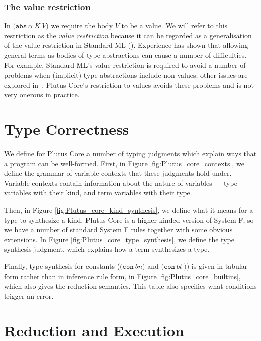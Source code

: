\documentclass[a4paper]{article}
\newcommand{\keyword}[1]{\texttt{#1}}
\newcommand{\construct}[1]{\texttt{(} #1 \texttt{)}}
\newcommand{\con}[1]{\construct{\keyword{con} ~ #1}}
\newcommand{\abs}[3]{\construct{\keyword{abs} ~ #1 ~ #2 ~ #3}}
\newcommand{\conT}[2]{\construct{\keyword{con} ~ #1 ~ #2}}
\begin{document}
\subsubsection{The value restriction}
In $\abs{\alpha}{K}{V}$ we require the body $V$ to be a value. We will
refer to this restriction as the \textit{value restriction} because it
can be regarded as a generalisation of the value restriction in
Standard ML (\cite[22.7]{Pierce:TAPL}). Experience has shown that
allowing general terms as bodies of type abstractions can cause a
number of difficulties.  For example, Standard ML's value restriction
is required to avoid a number of problems when (implicit) type
abstractions include non-values; other issues are explored
in~\cite[2.4]{Ahmed:2017}. Plutus Core's restriction to values avoids
these problems and is not very onerous in practice.
  


\section{Type Correctness}

We define for Plutus Core a number of typing judgments which explain ways that a program can be well-formed. First, in Figure \ref{fig:Plutus_core_contexts}, we define the grammar of variable contexts that these judgments hold under. Variable contexts contain information about the nature of variables --- type variables with their kind, and term variables with their type.

Then, in Figure \ref{fig:Plutus_core_kind_synthesis}, we define what it means for a type to synthesize a kind. Plutus Core is a higher-kinded version of System F, so we have a number of standard System F rules together with some obvious extensions. In Figure \ref{fig:Plutus_core_type_synthesis}, we define the type synthesis judgment, which explains how a term synthesizes a type.

Finally, type synthesis for constants ($\con{bn}$ and $\conT{bt}\!\!$)
is given in tabular form rather than in inference rule form, in Figure \ref{fig:Plutus_core_builtins}, which also gives the reduction semantics. This table also specifies what conditions trigger an error.








\section{Reduction and Execution}
\label{sec:reduction}
\end{document}
